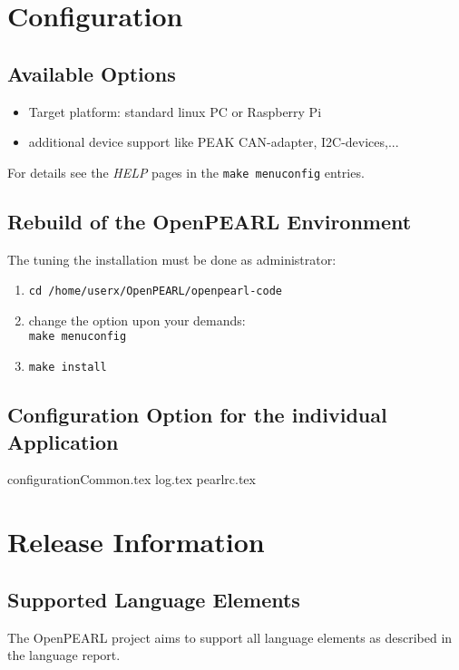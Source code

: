 \documentclass[10pt]{scrbook}
\begin{document}
\chapter{Configuration}
\section{Available Options}
\begin{itemize}
\item Target platform: standard linux PC or Raspberry Pi
\item additional device support like PEAK CAN-adapter, I2C-devices,...
\end{itemize}
For details see the {\em HELP} pages in the \verb|make menuconfig| 
entries.

\section{Rebuild of the OpenPEARL Environment}
The tuning the installation must be done as administrator:
\begin{enumerate}
\item \verb|cd /home/userx/OpenPEARL/openpearl-code|
\item change the option upon your demands:\\
      \verb|make menuconfig| 
\item \verb|make install|
\end{enumerate}

\section{Configuration Option for the individual Application}
{configurationCommon.tex}
{log.tex}
{pearlrc.tex}

\chapter{Release Information}
\section{Supported Language Elements}
The OpenPEARL project aims to support all language elements  as
described in the language report.
\end{document}
